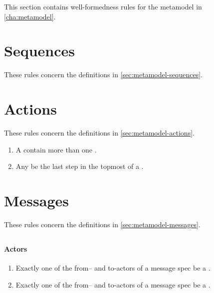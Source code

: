 
This section contains well-formedness rules for the metamodel in
\cref{cha:metamodel}.


\section{Sequences}\label{sec:wf-sequences}

These rules concern the definitions in \cref{sec:metamodel-sequences}.

\section{Actions}\label{sec:wf-actions}

These rules concern the definitions in \cref{sec:metamodel-actions}.

\begin{enumerate}
\item
  A \msequence{} \rfcmustnot{} contain more than one \mfinalaction.
\item
  Any \mfinalaction{} \rfcmust{} be the last step in the topmost
  \msubsequence{} of a \msequence.
\end{enumerate}

\section{Messages}\label{sec:wf-messages}

These rules concern the definitions in \cref{sec:metamodel-messages}.

\subsection{\mmessagespec}

\paragraph{Actors}

\begin{enumerate}
\item
	Exactly one of the from-- and to-actors of a message spec \rfcmust{} 
	be a \mtarget.
\item
	Exactly one of the from-- and to-actors of a message spec \rfcmust{} 
	be a \mworld.
\end{enumerate}

